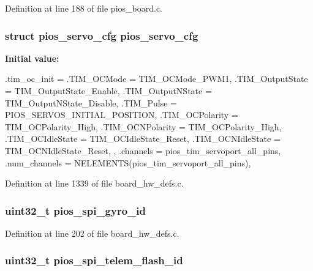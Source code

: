 \-Definition at line 188 of file pios\-\_\-board.\-c.

\hypertarget{group___freedom_ga57a87ef16d7949a9cc3589efc8d88a28}{
\subsubsection[{pios\-\_\-servo\-\_\-cfg}]{\setlength{\rightskip}{0pt plus 5cm}struct {\bf pios\-\_\-servo\-\_\-cfg} {\bf pios\-\_\-servo\-\_\-cfg}}}\label{group___freedom_ga57a87ef16d7949a9cc3589efc8d88a28}
{\bfseries \-Initial value\-:}
\begin{DoxyCode}
 {
        .tim_oc_init = {
                .TIM_OCMode = TIM_OCMode_PWM1,
                .TIM_OutputState = TIM_OutputState_Enable,
                .TIM_OutputNState = TIM_OutputNState_Disable,
                .TIM_Pulse = PIOS_SERVOS_INITIAL_POSITION,
                .TIM_OCPolarity = TIM_OCPolarity_High,
                .TIM_OCNPolarity = TIM_OCPolarity_High,
                .TIM_OCIdleState = TIM_OCIdleState_Reset,
                .TIM_OCNIdleState = TIM_OCNIdleState_Reset,
        },
        .channels = pios_tim_servoport_all_pins,
        .num_channels = NELEMENTS(pios_tim_servoport_all_pins),
}
\end{DoxyCode}


\-Definition at line 1339 of file board\-\_\-hw\-\_\-defs.\-c.

\hypertarget{group___freedom_gaa3af759a1b634a729e4688dc40026875}{
\subsubsection[{pios\-\_\-spi\-\_\-gyro\-\_\-id}]{\setlength{\rightskip}{0pt plus 5cm}uint32\-\_\-t {\bf pios\-\_\-spi\-\_\-gyro\-\_\-id}}}\label{group___freedom_gaa3af759a1b634a729e4688dc40026875}


\-Definition at line 202 of file board\-\_\-hw\-\_\-defs.\-c.

\hypertarget{group___freedom_gabcea731eedc7b51eae0e4074e35fc8c1}{
\subsubsection[{pios\-\_\-spi\-\_\-telem\-\_\-flash\-\_\-id}]{\setlength{\rightskip}{0pt plus 5cm}uint32\-\_\-t {\bf pios\-\_\-spi\-\_\-telem\-\_\-flash\-\_\-id}}}\label{group___freedom_gabcea731eedc7b51eae0e4074e35fc8c1}



